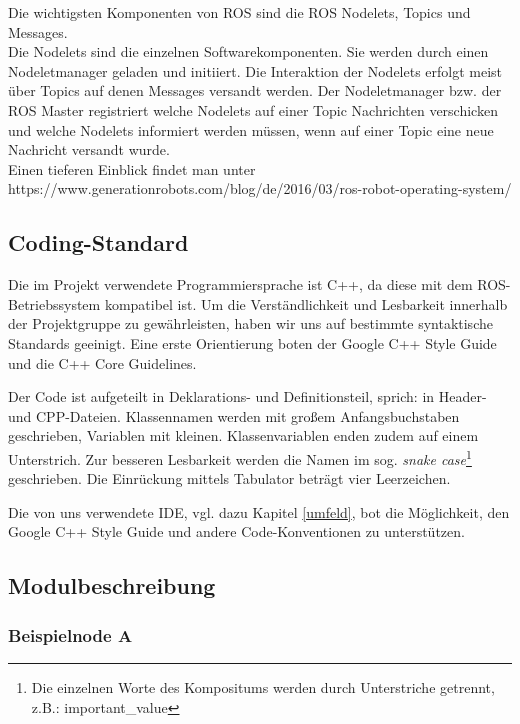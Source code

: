 \documentclass[a4paper, 12pt, titlepage]{scrartcl}
\begin{document}
		Die wichtigsten Komponenten von ROS sind die ROS Nodelets, Topics und Messages. \\

		Die Nodelets sind die einzelnen Softwarekomponenten. Sie werden durch einen Nodeletmanager geladen und initiiert. Die Interaktion der Nodelets erfolgt meist über Topics auf denen Messages versandt werden. Der Nodeletmanager bzw. der ROS Master registriert welche Nodelets auf einer Topic Nachrichten verschicken und welche Nodelets informiert werden müssen, wenn auf einer Topic eine neue Nachricht versandt wurde.\\

		Einen tieferen Einblick findet man unter\\
		https://www.generationrobots.com/blog/de/2016/03/ros-robot-operating-system/

		\subsection{Coding-Standard} 
		\label{coding_standard}
			Die im Projekt verwendete Programmiersprache ist C++, da diese mit dem ROS-Betriebssystem kompatibel ist. 
			Um die Verständlichkeit und Lesbarkeit innerhalb der Projektgruppe zu gewährleisten, haben wir uns auf 
			bestimmte syntaktische Standards geeinigt. Eine erste Orientierung boten der Google C++ Style Guide\cite{googleTest} und die C++ Core Guidelines\cite{cppCoreGuide}. 
			
			Der Code ist aufgeteilt in Deklarations- und Definitionsteil, sprich: in Header- und CPP-Dateien.
			Klassennamen werden mit großem Anfangsbuchstaben geschrieben, Variablen mit kleinen. Klassenvariablen enden zudem 
			auf einem Unterstrich. Zur besseren Lesbarkeit werden die Namen im sog. \emph{snake case}\footnote{Die einzelnen 
			Worte des Kompositums werden durch Unterstriche getrennt, z.B.: important\_value} geschrieben. 
			Die Einrückung mittels Tabulator beträgt vier Leerzeichen. 
			
			Die von uns verwendete IDE, vgl. dazu Kapitel \ref{umfeld}, bot die Möglichkeit, den Google C++ Style Guide und andere Code-Konventionen zu unterstützen. 

		\subsection{Modulbeschreibung} 
		\label{modulbeschreibung}
			\subsubsection{Beispielnode A}
			\label{node_a}
\end{document}
